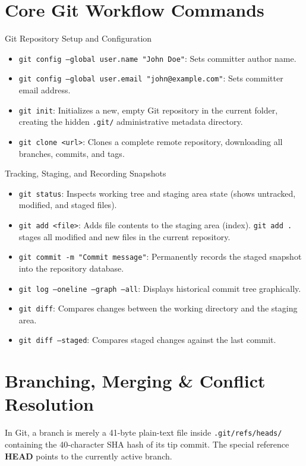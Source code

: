 \section{Core Git Workflow Commands}
\begin{commandbox}{Git Repository Setup and Configuration}
\begin{itemize}[leftmargin=1.5em]
    \item \texttt{git config --global user.name "John Doe"}: Sets committer author name.
    \item \texttt{git config --global user.email "john@example.com"}: Sets committer email address.
    \item \texttt{git init}: Initializes a new, empty Git repository in the current folder, creating the hidden \texttt{.git/} administrative metadata directory.
    \item \texttt{git clone <url>}: Clones a complete remote repository, downloading all branches, commits, and tags.
\end{itemize}
\end{commandbox}

\begin{commandbox}{Tracking, Staging, and Recording Snapshots}
\begin{itemize}[leftmargin=1.5em]
    \item \texttt{git status}: Inspects working tree and staging area state (shows untracked, modified, and staged files).
    \item \texttt{git add <file>}: Adds file contents to the staging area (index). \texttt{git add .} stages all modified and new files in the current repository.
    \item \texttt{git commit -m "Commit message"}: Permanently records the staged snapshot into the repository database.
    \item \texttt{git log --oneline --graph --all}: Displays historical commit tree graphically.
    \item \texttt{git diff}: Compares changes between the working directory and the staging area.
    \item \texttt{git diff --staged}: Compares staged changes against the last commit.
\end{itemize}
\end{commandbox}

\section{Branching, Merging \& Conflict Resolution}
In Git, a branch is merely a 41-byte plain-text file inside \texttt{.git/refs/heads/} containing the 40-character SHA hash of its tip commit. The special reference \textbf{HEAD} points to the currently active branch.

